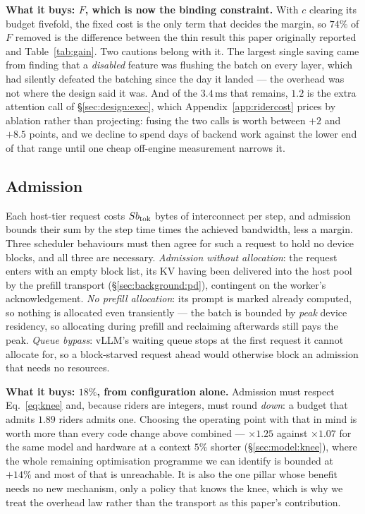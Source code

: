 \textbf{What it buys: $F$, which is now the binding constraint.} With $c$ clearing
its budget fivefold, the fixed cost is the only term that decides the margin, so
$74\%$ of $F$ removed is the difference between the thin result this paper
originally reported and Table~\ref{tab:gain}. Two cautions belong with it. The
largest single saving came from finding that a \emph{disabled} feature was flushing
the batch on every layer, which had silently defeated the batching since the day it
landed --- the overhead was not where the design said it was. And of the $3.4$\,ms
that remains, $1.2$ is the extra attention call of \S\ref{sec:design:exec}, which
Appendix~\ref{app:ridercost} prices by ablation rather than projecting: fusing the
two calls is worth between $+2$ and $+8.5$ points, and we decline to spend days of
backend work against the lower end of that range until one cheap off-engine
measurement narrows it.

\subsection{Admission}
\label{sec:design:admission}

Each host-tier request costs $Sb_{\mathrm{tok}}$ bytes of interconnect per step, and
admission bounds their sum by the step time times the achieved bandwidth, less a
margin. Three scheduler behaviours must then agree for such a request to hold no
device blocks, and all three are necessary. \emph{Admission without allocation}:
the request enters with an empty block list, its KV having been delivered into
the host pool by the prefill transport (\S\ref{sec:background:pd}), contingent on
the worker's acknowledgement. \emph{No prefill allocation}: its prompt is marked
already computed, so nothing is allocated even transiently --- the batch is
bounded by \emph{peak} device residency, so allocating during prefill and
reclaiming afterwards still pays the peak. \emph{Queue bypass}: vLLM's waiting
queue stops at the first request it cannot allocate for, so a block-starved
request ahead would otherwise block an admission that needs no resources.

\textbf{What it buys: $18\%$, from configuration alone.} Admission must respect
Eq.~\ref{eq:knee} and, because riders are integers, must round \emph{down}: a
budget that admits $1.89$ riders admits one. Choosing the operating point with that
in mind is worth more than every code change above combined --- $\times 1.25$
against $\times 1.07$ for the same model and hardware at a context $5\%$ shorter
(\S\ref{sec:model:knee}), where the whole remaining optimisation programme we can
identify is bounded at $+14\%$ and most of that is unreachable. It is also the one
pillar whose benefit needs no new mechanism, only a policy that knows the knee,
which is why we treat the overhead law rather than the transport as this paper's
contribution.

